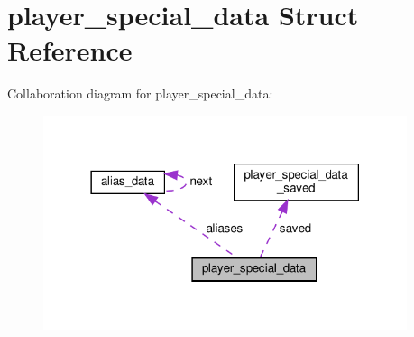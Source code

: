 \hypertarget{structplayer__special__data}{}\section{player\+\_\+special\+\_\+data Struct Reference}
\label{structplayer__special__data}


Collaboration diagram for player\+\_\+special\+\_\+data\+:
\nopagebreak
\begin{figure}[H]
\begin{center}
\leavevmode
\includegraphics[width=302pt]{structplayer__special__data__coll__graph}
\end{center}
\end{figure}

